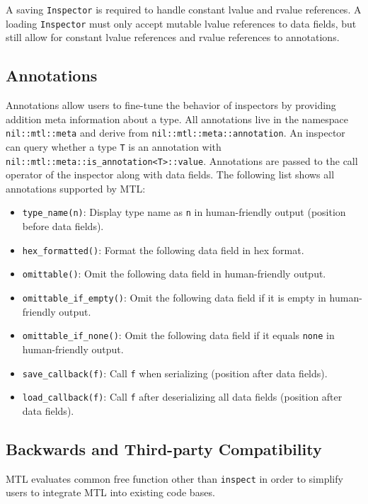 A saving \lstinline^Inspector^ is required to handle constant lvalue and rvalue
references. A loading \lstinline^Inspector^ must only accept mutable lvalue
references to data fields, but still allow for constant lvalue references and
rvalue references to annotations.

\subsection{Annotations}

Annotations allow users to fine-tune the behavior of inspectors by providing
addition meta information about a type. All annotations live in the namespace
\lstinline^nil::mtl::meta^ and derive from \lstinline^nil::mtl::meta::annotation^. An
inspector can query whether a type \lstinline^T^ is an annotation with
\lstinline^nil::mtl::meta::is_annotation<T>::value^. Annotations are passed to the
call operator of the inspector along with data fields. The following list shows
all annotations supported by MTL:

\begin{itemize}
\item \lstinline^type_name(n)^: Display type name as \lstinline^n^ in
  human-friendly output (position before data fields).
\item \lstinline^hex_formatted()^: Format the following data field in hex
  format.
\item \lstinline^omittable()^: Omit the following data field in human-friendly
  output.
\item \lstinline^omittable_if_empty()^: Omit the following data field if it is
  empty in human-friendly output.
\item \lstinline^omittable_if_none()^: Omit the following data field if it
  equals \lstinline^none^ in human-friendly output.
\item \lstinline^save_callback(f)^: Call \lstinline^f^ when serializing
  (position after data fields).
\item \lstinline^load_callback(f)^: Call \lstinline^f^ after deserializing all
  data fields (position after data fields).
\end{itemize}

\subsection{Backwards and Third-party Compatibility}

MTL evaluates common free function other than \lstinline^inspect^ in order to
simplify users to integrate MTL into existing code bases.

